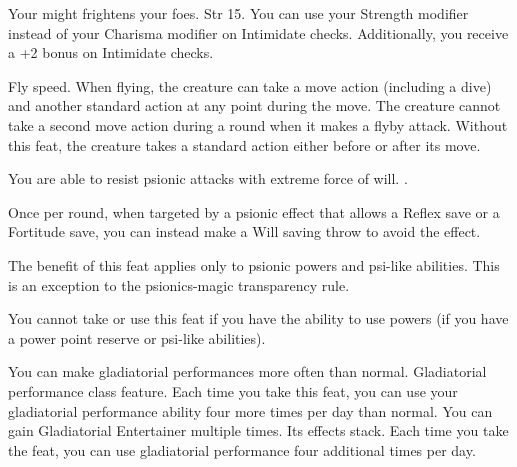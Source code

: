 {Your might frightens your foes.}
{Str 15.}
{You can use your Strength modifier instead of your Charisma modifier on Intimidate checks. Additionally, you receive a +2 bonus on Intimidate checks.}{}{}

{}
{Fly speed.}
{When flying, the creature can take a move action (including a dive) and another standard action at any point during the move. The creature cannot take a second move action during a round when it makes a flyby attack.}
{Without this feat, the creature takes a standard action either before or after its move.}
{}

{You are able to resist psionic attacks with extreme force of will.}
{.}
{Once per round, when targeted by a psionic effect that allows a Reflex save or a Fortitude save, you can instead make a Will saving throw to avoid the effect.

The benefit of this feat applies only to psionic powers and psi-like abilities. This is an exception to the psionics-magic transparency rule.}{}
{You cannot take or use this feat if you have the ability to use powers (if you have a power point reserve or psi-like abilities).}

{You can make gladiatorial performances more often than normal.}
{Gladiatorial performance class feature.}
{Each time you take this feat, you can use your gladiatorial performance ability four more times per day than normal.}
{}
{You can gain Gladiatorial Entertainer multiple times. Its effects stack. Each time you take the feat, you can use gladiatorial performance four additional times per day.}

